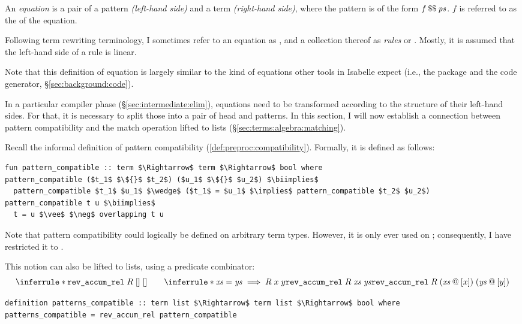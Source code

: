 \begin{definition}\label{def:terms:algebra:thy:eq}
  An \emph{equation} is a pair of a pattern \emph{(left-hand side)} and a term \emph{(right-hand side)}, where the pattern is of the form $f\mathbin{\$\$}\mathit{ps}$.
  $f$ is referred to as the  of the equation.
\end{definition}

\noindent
Following term rewriting terminology, I sometimes refer to an equation as , and a collection thereof as \emph{rules} or .
Mostly, it is assumed that the left-hand side of a rule is linear.

Note that this definition of equation is largely similar to the kind of equations other tools in Isabelle expect (i.e., the  package and the code generator, §\ref{sec:background:code}).

In a particular compiler phase (§\ref{sec:intermediate:elim}), equations need to be transformed according to the structure of their left-hand sides.
For that, it is necessary to split those into a pair of head and patterns.
In this section, I will now establish a connection between pattern compatibility and the match operation lifted to lists (§\ref{sec:terms:algebra:matching}).

Recall the informal definition of pattern compatibility (\cref{def:preproc:compatibility}).
Formally, it is defined as follows:
\begin{lstlisting}
fun pattern_compatible :: term $\Rightarrow$ term $\Rightarrow$ bool where
pattern_compatible ($t_1$ $\${}$ $t_2$) ($u_1$ $\${}$ $u_2$) $\biimplies$
  pattern_compatible $t_1$ $u_1$ $\wedge$ ($t_1$ = $u_1$ $\implies$ pattern_compatible $t_2$ $u_2$)
pattern_compatible t u $\biimplies$
  t = u $\vee$ $\neg$ overlapping t u
\end{lstlisting}
%
Note that pattern compatibility could logically be defined on arbitrary term types.
However, it is only ever used on ; consequently, I have restricted it to .

This notion can also be lifted to lists, using a predicate combinator:
%
\[
  \inferrule*{
  }{\holconst{rev\_accum\_rel}\;R\;[]\;[]} \qquad
  \inferrule*{
    \mathit{xs} = \mathit{ys} \implies R\;x\;y \\
    \holconst{rev\_accum\_rel}\;R\;\mathit{xs}\;\mathit{ys}
  }{\holconst{rev\_accum\_rel}\;R\;(\mathit{xs}\append[x])\;(\mathit{ys}\append[y])}
\]
%
\begin{lstlisting}
definition patterns_compatible :: term list $\Rightarrow$ term list $\Rightarrow$ bool where
patterns_compatible = rev_accum_rel pattern_compatible
\end{lstlisting}

